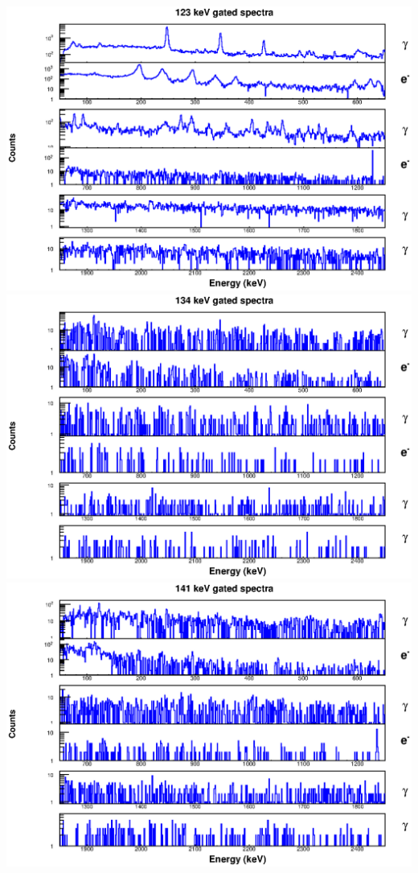 \begin{landscape}
\includegraphics[scale=1.1]{154Gd_Appendix/123_combined.eps}
\includegraphics[scale=1.1]{154Gd_Appendix/134_combined.eps}
\includegraphics[scale=1.1]{154Gd_Appendix/141_combined.eps}

\end{landscape}

